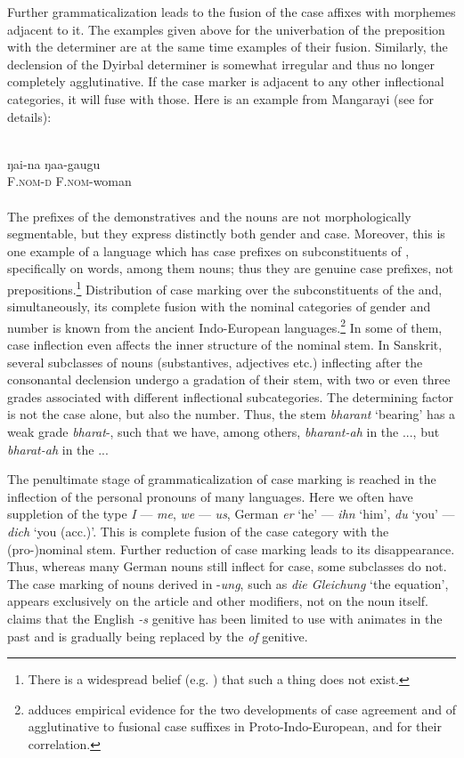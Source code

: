 Further grammaticalization leads to the fusion of the case affixes with morphemes adjacent to it. The examples given above for the univerbation of the preposition with the determiner are at the same time examples of their fusion. Similarly, the declension of the Dyirbal determiner is somewhat irregular and thus no longer completely agglutinative. If the case marker is adjacent to any other inflectional categories, it will fuse with those. Here is an example from Mangarayi (see  for details):
  
\ea\label{ex:E61}
\\
\gll ŋai-na  ŋaa-gaugu\\
 F.\textsc{nom}-\textsc{d}  F.\textsc{nom}-woman\\
\\
\z
\noindent The prefixes of the demonstratives and the nouns are not morphologically segmentable, but they express distinctly both gender and case. Moreover, this is one example of a language which has case prefixes on subconstituents of \nps, specifically on words, among them nouns; thus they are genuine case prefixes, not prepositions.\footnote{There is a widespread belief (e.g. \citealt[135--140]{Kahr1976}) that such a thing does not exist.} Distribution of case marking over the subconstituents of the \np and, simultaneously, its complete fusion with the nominal categories of gender and number is known from the ancient Indo-European languages.\footnote{\citet{Haudry1980} adduces empirical evidence for the two developments of case agreement and of agglutinative to fusional case suffixes in Proto-Indo-European, and for their correlation.} In some of them, case inflection even affects the inner structure of the nominal stem. In Sanskrit, several subclasses of nouns (substantives, adjectives etc.) inflecting after the consonantal declension undergo a gradation of their stem, with two or even three grades associated with different inflectional subcategories. The determining factor is not the case alone, but also the number. Thus, the stem \textit{bharant} ‘bearing’ has a weak grade \textit{bharat}{}-, such that we have, among others, \textit{bharant-ah} in the \glnom.\glpl.\glm., but \textit{bharat-ah} in the \glacc.\glpl.\glm.

The penultimate stage of grammaticalization of case marking is reached in the inflection of the personal pronouns of many languages. Here we often have suppletion of the type \textit{I} — \textit{me}, \textit{we} — \textit{us}, German \textit{er} ‘he’ — \textit{ihn} ‘him’, \textit{du} ‘you’ — \textit{dich} ‘you (acc.)’. This is complete fusion of the case category with the \mbox{(pro-)}nominal stem. Further reduction of case marking leads to its disappearance. Thus, where\-as many German nouns still inflect for case, some subclasses do not. The case marking of nouns derived in -\textit{ung}, such as \textit{die Gleichung} ‘the equation’, appears exclusively on the article and other modifiers, not on the noun itself. \citet[164f]{Sapir1921} claims that the English \textit{{}-s} genitive has been limited to use with animates in the past and is gradually being replaced by the \textit{of} genitive.

